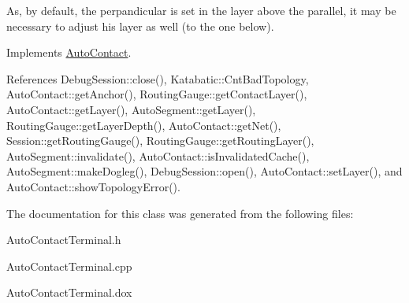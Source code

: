 As, by default, the perpandicular is set in the layer above the parallel, it may be necessary to adjust his layer as well (to the one below).

 

Implements \mbox{\hyperlink{classKatabatic_1_1AutoContact_a690764ddc997fe9766a79c4b8e0c3e2f}{Auto\+Contact}}.



References Debug\+Session\+::close(), Katabatic\+::\+Cnt\+Bad\+Topology, Auto\+Contact\+::get\+Anchor(), Routing\+Gauge\+::get\+Contact\+Layer(), Auto\+Contact\+::get\+Layer(), Auto\+Segment\+::get\+Layer(), Routing\+Gauge\+::get\+Layer\+Depth(), Auto\+Contact\+::get\+Net(), Session\+::get\+Routing\+Gauge(), Routing\+Gauge\+::get\+Routing\+Layer(), Auto\+Segment\+::invalidate(), Auto\+Contact\+::is\+Invalidated\+Cache(), Auto\+Segment\+::make\+Dogleg(), Debug\+Session\+::open(), Auto\+Contact\+::set\+Layer(), and Auto\+Contact\+::show\+Topology\+Error().



The documentation for this class was generated from the following files\+:\begin{DoxyCompactItemize}
\item 
Auto\+Contact\+Terminal.\+h\item 
Auto\+Contact\+Terminal.\+cpp\item 
Auto\+Contact\+Terminal.\+dox\end{DoxyCompactItemize}

